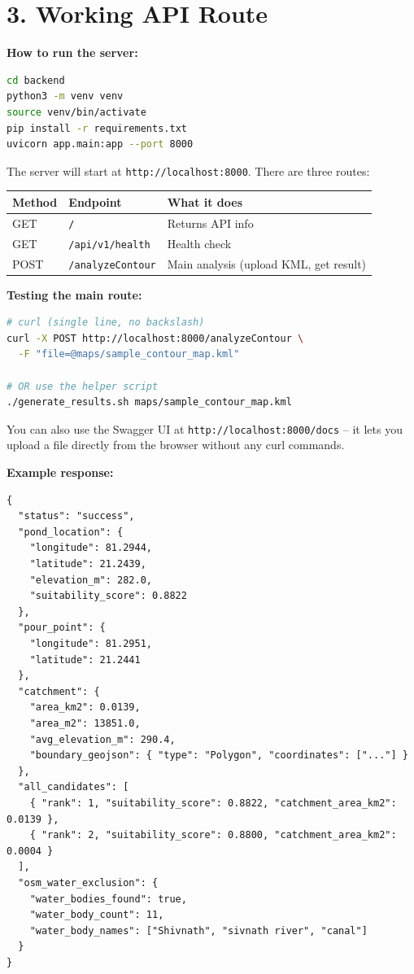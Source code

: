 \documentclass[12pt,a4paper]{article}
\begin{document}
\section*{3. Working API Route}

\textbf{How to run the server:}

\begin{lstlisting}[language=bash]
cd backend
python3 -m venv venv
source venv/bin/activate
pip install -r requirements.txt
uvicorn app.main:app --port 8000
\end{lstlisting}

The server will start at \texttt{http://localhost:8000}. There are three routes:

\begin{center}
\begin{tabular}{lll}
\toprule
Method & Endpoint & What it does \\
\midrule
GET  & \texttt{/}              & Returns API info \\
GET  & \texttt{/api/v1/health} & Health check \\
POST & \texttt{/analyzeContour}& Main analysis (upload KML, get result) \\
\bottomrule
\end{tabular}
\end{center}

\textbf{Testing the main route:}

\begin{lstlisting}[language=bash]
# curl (single line, no backslash)
curl -X POST http://localhost:8000/analyzeContour \
  -F "file=@maps/sample_contour_map.kml"

# OR use the helper script
./generate_results.sh maps/sample_contour_map.kml
\end{lstlisting}

You can also use the Swagger UI at \texttt{http://localhost:8000/docs} -- it
lets you upload a file directly from the browser without any curl commands.

\textbf{Example response:}

\begin{lstlisting}
{
  "status": "success",
  "pond_location": {
    "longitude": 81.2944,
    "latitude": 21.2439,
    "elevation_m": 282.0,
    "suitability_score": 0.8822
  },
  "pour_point": {
    "longitude": 81.2951,
    "latitude": 21.2441
  },
  "catchment": {
    "area_km2": 0.0139,
    "area_m2": 13851.0,
    "avg_elevation_m": 290.4,
    "boundary_geojson": { "type": "Polygon", "coordinates": ["..."] }
  },
  "all_candidates": [
    { "rank": 1, "suitability_score": 0.8822, "catchment_area_km2": 0.0139 },
    { "rank": 2, "suitability_score": 0.8800, "catchment_area_km2": 0.0004 }
  ],
  "osm_water_exclusion": {
    "water_bodies_found": true,
    "water_body_count": 11,
    "water_body_names": ["Shivnath", "sivnath river", "canal"]
  }
}
\end{lstlisting}
\end{document}
